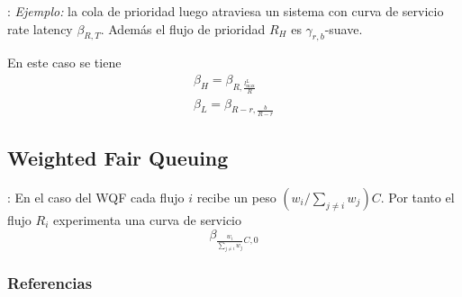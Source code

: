 \documentclass[xcolor={x11names}]{beamer}
\begin{document}
\begin{frame}{\secname: \subsecname}
    \emph{Ejemplo:} la cola de
    prioridad luego atraviesa
    un sistema con curva de servicio
    rate latency $\beta_{R,T}$.
    Además el flujo de prioridad
    $R_H$ es $\gamma_{r,b}$-suave.


    \vfill
    \begin{figure}[h]
        \centering
        
    \end{figure}
    \vfill

    En este caso se tiene
    \begin{align*}
        \beta_H=\beta_{R,\tfrac{l_{\max}^L}{R}}\\
        \beta_L=\beta_{R-r,\tfrac{b}{R-r}}
    \end{align*}


\end{frame}



\subsection{Weighted Fair Queuing}
\begin{frame}{\secname: \subsecname}
    En el caso del WQF cada flujo
    $i$ recibe un peso
    $(w_i/\sum_{j\neq i}w_j)C$.
    Por tanto el flujo $R_i$ experimenta
    una curva de servicio
    \begin{equation*}
        \beta_{\frac{w_i}{\sum_{j\neq i}w_j}C,0}
    \end{equation*}
\end{frame}




\begin{frame}[allowframebreaks]
        \frametitle{Referencias}
        
        
\end{frame}
\end{document}
